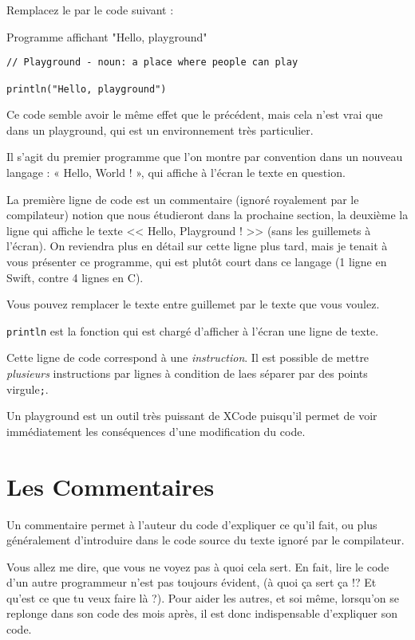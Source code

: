 Remplacez le par le code suivant :
\begin{listing}[h]
\caption{Programme affichant "Hello, playground"}
\begin{verbatim}
// Playground - noun: a place where people can play

println("Hello, playground")
\end{verbatim}
\end{listing}

Ce code semble avoir le même effet que le précédent, mais cela n'est vrai que dans un playground, qui est un environnement très particulier.

Il s’agit du premier programme que l’on montre par convention dans un nouveau langage :
« Hello, World ! », qui affiche à l’écran le texte en question.

La première ligne de code est un commentaire (ignoré royalement par le compilateur)
notion que nous étudieront dans la prochaine section, la deuxième la ligne qui affiche le
texte << Hello, Playground ! >> (sans les guillemets à l’écran).
On reviendra plus en détail sur cette ligne plus tard, mais je tenait à vous présenter ce
programme, qui est plutôt court dans ce langage (1 ligne en Swift, contre 4 lignes en C).

Vous pouvez remplacer le texte entre guillemet par le texte que vous voulez.

\texttt{println} est la fonction qui est chargé d’afficher à l’écran une ligne de texte.

Cette ligne de code correspond à une \emph{instruction}.
Il est possible de mettre \emph{plusieurs} instructions par lignes à condition de laes séparer par des points virgule\verb";".

Un playground est un outil très puissant de XCode puisqu’il permet de voir immédiatement
les conséquences d’une modification du code.
\section{Les Commentaires}
Un commentaire permet à l’auteur du code d’expliquer ce qu’il fait, ou plus généralement
d’introduire dans le code source du texte ignoré par le compilateur.

Vous allez me dire, que vous ne voyez pas à quoi cela sert. En fait, lire le code d’un autre
programmeur n’est pas toujours évident, (à quoi ça sert ça !? Et qu’est ce que tu veux faire
là ?). Pour aider les autres, et soi même, lorsqu’on se replonge dans son code des mois après, il est donc
indispensable d’expliquer son code.

